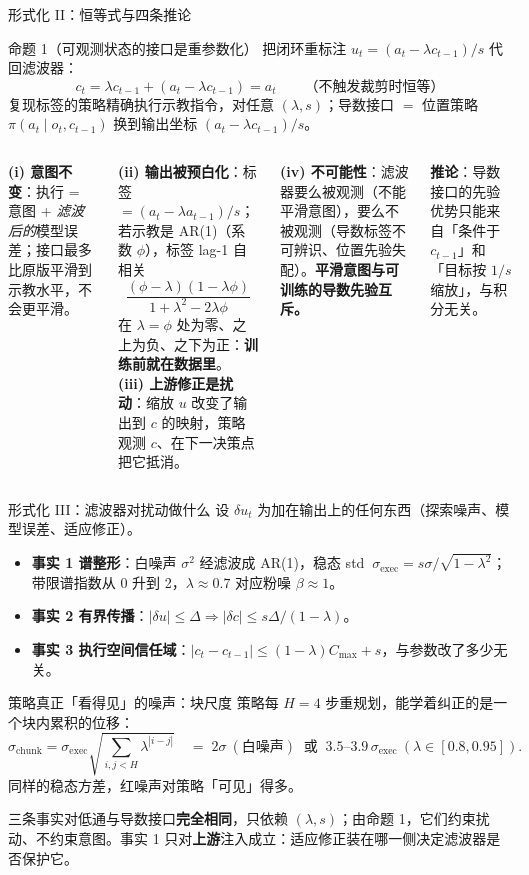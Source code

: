 \documentclass[10pt,aspectratio=169]{beamer}
\newcommand{\ba}[1]{\textcolor{bad}{\textbf{#1}}}
\newcommand{\sexec}{\sigma_{\mathrm{exec}}}
\newcommand{\schunk}{\sigma_{\mathrm{chunk}}}
\begin{document}
\begin{frame}[shrink=8]{形式化 II：恒等式与四条推论}
\begin{block}{命题 1（可观测状态的接口是重参数化）}
把闭环重标注 $u_t=(a_t-\lambda c_{t-1})/s$ 代回滤波器：
\[
c_t=\lambda c_{t-1}+(a_t-\lambda c_{t-1})=a_t\qquad\text{（不触发裁剪时恒等）}
\]
复现标签的策略精确执行示教指令，对任意 $(\lambda,s)$；导数接口 $=$ 位置策略 $\pi(a_t\mid o_t,c_{t-1})$ 换到输出坐标 $(a_t-\lambda c_{t-1})/s$。
\end{block}
\begin{columns}[T]
\textbf{(i) 意图不变}：执行 = 意图 + \emph{滤波后的}模型误差；接口最多比原版平滑到示教水平，不会更平滑。

\textbf{(ii) 输出被预白化}：标签 $=(a_t-\lambda a_{t-1})/s$；若示教是 AR(1)（系数 $\phi$），标签 lag-1 自相关
\[
\frac{(\phi-\lambda)(1-\lambda\phi)}{1+\lambda^2-2\lambda\phi}
\]
在 $\lambda=\phi$ 处为零、之上为负、之下为正：\textbf{训练前就在数据里}。
\textbf{(iii) 上游修正是扰动}：缩放 $u$ 改变了输出到 $c$ 的映射，策略观测 $c$、在下一决策点把它抵消。

\textbf{(iv) 不可能性}：滤波器要么被观测（不能平滑意图），要么不被观测（导数标签不可辨识、位置先验失配）。\ba{平滑意图与可训练的导数先验互斥。}

\vspace{2mm}
\textbf{推论}：导数接口的先验优势只能来自「条件于 $c_{t-1}$」和「目标按 $1/s$ 缩放」，与积分无关。
\end{columns}
\end{frame}

\begin{frame}{形式化 III：滤波器对扰动做什么}
设 $\delta u_t$ 为加在输出上的任何东西（探索噪声、模型误差、适应修正）。
\begin{itemize}
\item \textbf{事实 1 谱整形}：白噪声 $\sigma^2$ 经滤波成 AR(1)，稳态 std $\ \sexec=s\sigma/\sqrt{1-\lambda^2}$；带限谱指数从 0 升到 2，$\lambda\approx0.7$ 对应粉噪 $\beta\approx1$。
\item \textbf{事实 2 有界传播}：$|\delta u|\le\Delta\Rightarrow|\delta c|\le s\Delta/(1-\lambda)$。
\item \textbf{事实 3 执行空间信任域}：$|c_t-c_{t-1}|\le(1-\lambda)C_{\max}+s$，与参数改了多少无关。
\end{itemize}
\begin{block}{策略真正「看得见」的噪声：块尺度}
策略每 $H=4$ 步重规划，能学着纠正的是一个块内累积的位移：
\[
\schunk=\sexec\sqrt{\textstyle\sum_{i,j<H}\lambda^{|i-j|}}
\quad=\;2\sigma\ (\text{白噪声})\;\;\text{或}\;\;3.5\text{--}3.9\,\sexec\ (\lambda\in[0.8,0.95]).
\]
同样的稳态方差，红噪声对策略「可见」得多。
\end{block}
\small 三条事实对低通与导数接口\textbf{完全相同}，只依赖 $(\lambda,s)$；由命题 1，它们约束扰动、不约束意图。事实 1 只对\textbf{上游}注入成立：适应修正装在哪一侧决定滤波器是否保护它。
\end{frame}
\end{document}
